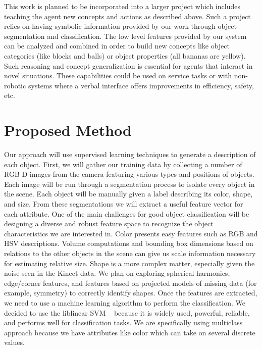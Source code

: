 \documentclass[11pt]{article}
\newcommand{\xxx}[1]{{\bf \color{red} #1}}
\begin{document}
This work is planned to be incorporated into a larger project which includes teaching the agent new concepts and actions as described above. Such a project relies on having symbolic information provided by our work through object segmentation and classification. The low level features provided by our system can be analyzed and combined in order to build new concepts like object categories (like blocks and balls) or object properties (all bananas are yellow). Such reasoning and concept generalization is essential for agents that interact in novel situations. These capabilities could be used on service tasks or with non-robotic systems where a verbal interface
offers improvements in efficiency, safety, etc.

\section{Proposed Method}

Our approach will use supervised learning techniques to generate a description of each object. First, we will gather our training data by collecting a number of RGB-D images from the camera featuring various types and positions of objects. Each image will be run through a segmentation process to isolate every object in the scene. Each object will be manually given a label describing its color, shape, and size. From these segmentations we will extract a useful feature vector for each attribute. One of the main challenges for good object classification will be designing a
diverse and robust feature space to recognize the object characteristics we
are interested in. Color presents easy features such as RGB and HSV
descriptions. Volume computations and bounding box dimensions based on
relations to the other objects in the scene can give us scale information
necessary for estimating relative size. Shape is a more complex matter,
especially given the noise seen in the Kinect data. We plan on exploring
spherical harmonics, edge/corner features, and features based on projected
models of missing data (for example, symmetry) to correctly identify shapes.
Once the features are extracted, we need to use a machine learning algorithm to perform the classification. We decided to use the liblinear SVM ~\cite{LIBLINEAR} because it is widely used, powerful, reliable, and performs well for classification tasks. We are specifically using multiclass approach because we have attributes like color which can take on several discrete values.
\end{document}
